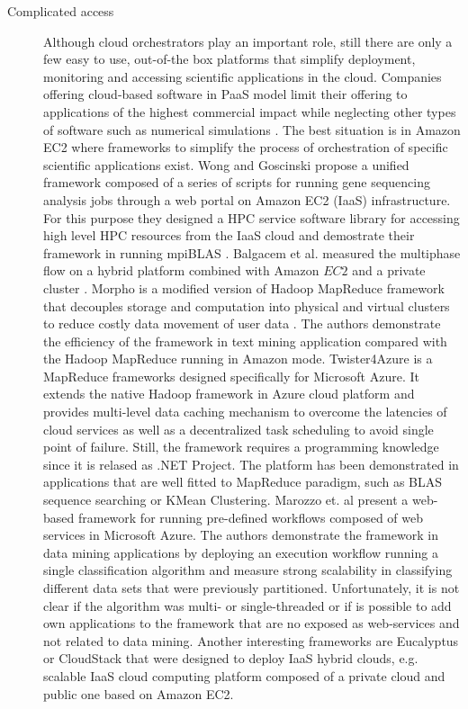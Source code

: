 \documentclass[3p,times]{elsarticle}
\begin{document}
\begin{description}
\item[Complicated access] Although cloud orchestrators play an important role, still there are only a few easy to use, out-of-the box platforms that simplify deployment, monitoring and accessing scientific applications in the cloud. Companies offering cloud-based software in PaaS model limit their offering to applications of the highest commercial impact while neglecting other types of software such as numerical simulations \cite{CloudStack} \cite{OpenStack}. The best situation is in Amazon EC2 where frameworks to simplify the process of orchestration of specific scientific applications exist. Wong and Goscinski propose a unified framework composed of a series of scripts for running gene sequencing analysis jobs through a web portal \cite{Wong2013} on Amazon EC2 (IaaS) infrastructure. For this purpose they designed a HPC service software library for accessing high level HPC resources from the IaaS cloud and demostrate their framework in running mpiBLAS \cite{mpiBlas}. Balgacem et al. measured the multiphase flow on a hybrid platform combined with Amazon $EC2$ and a private cluster \cite{BenBelgacem2015}. Morpho is a modified version of Hadoop MapReduce framework that decouples storage and computation into physical and virtual clusters to reduce costly data movement of user data \cite{Lu2014}. The authors demonstrate the efficiency of the  framework in text mining application compared with the Hadoop MapReduce running in Amazon mode. Twister4Azure is a MapReduce frameworks designed specifically for Microsoft Azure. It extends the native Hadoop framework in Azure cloud platform and provides multi-level data caching mechanism to overcome the latencies of cloud services as well as a decentralized task scheduling to avoid single point of failure. Still, the framework requires a programming knowledge since it is relased as .NET Project. The platform has been demonstrated in applications that are well fitted to MapReduce paradigm, such as BLAS sequence searching or KMean Clustering. Marozzo et. al \cite{catlett2013cloud} present a web-based framework for running pre-defined workflows composed of web services in Microsoft Azure. The authors demonstrate the framework in data mining applications by deploying an execution workflow running a single classification algorithm and measure strong scalability in classifying different data sets that were previously partitioned. Unfortunately, it is not clear if the algorithm was multi- or single-threaded or if is possible to add own applications to the framework that are no exposed as web-services and not related to data mining. 
Another interesting frameworks are Eucalyptus \cite{eucalyptus} or CloudStack \cite{CloudStack} that were designed to deploy IaaS hybrid clouds, e.g. scalable IaaS cloud computing platform composed of a private cloud and public one based on Amazon EC2.
\end{description}
\end{document}
